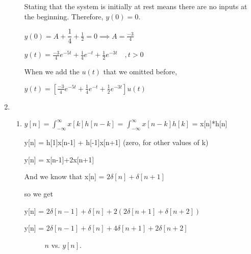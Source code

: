 \documentclass[10pt,a4paper, margin=1in]{article}
\begin{document}
\begin{enumerate}
\begin{enumerate}
    Stating that the system is initially at rest means there are no inputs at the beginning. Therefore, $y(0) = 0$.
    
    $y(0)=A+\dfrac{1}{4}+\frac{1}{2} = 0 \implies A =\frac{-3}{4}$
    
    $y(t)= \frac{-3}{4}e^{-5t}+ \frac{1}{4}e^{-t} + \frac{1}{2}e^{-3t} \quad ,t>0$
    
    When we add the $u(t)$ that we omitted before,
    
    $y(t)=[\frac{-3}{4}e^{-5t}+\frac{1}{4}e^{-t}+\frac{1}{2}e^{-3t}]u(t)$
    
    \end{enumerate}

\item %
    \begin{enumerate}
    \item %
    
    $y[n] = \int_{-\infty}^{\infty}x[k]h[n-k]$ = $\int_{-\infty}^{\infty}x[n-k]h[k]$ = x[n]*h[n]
    \vspace{0.25cm}
    
    y[n] = h[1]x[n-1] + h[-1]x[n+1] (zero, for other values of k)
    
    y[n] = x[n-1]+2x[n+1] 
    
    And we know that x[n] = $2\delta[n]+\delta[n+1]$
    
    so we get
    
    y[n] = $2\delta[n-1]+\delta[n]+2(2\delta[n+1]+\delta[n+2])$
    
    y[n] = $2\delta[n-1]+\delta[n]+4\delta[n+1]+2\delta[n+2]$
    
        \begin{figure}[h!]
    \centering
    \caption{$n$ vs. $y[n]$.}
    \label{fig:q3}
    \end{figure}
    

\end{enumerate}
\end{enumerate}
\end{document}
